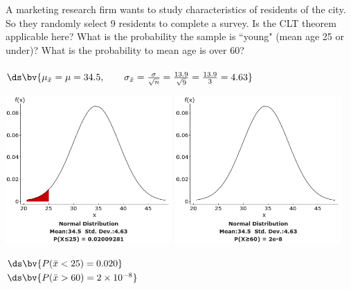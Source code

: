 \documentclass{article}
\begin{document}
\begin{flushleft}
\begin{enumalpha}
\item A marketing research firm wants to study characteristics of residents of the city. So they randomly select 9 residents to complete a survey. Is the CLT theorem applicable here? What is the probability the sample is ``young" (mean age 25 or under)? What is the probability to mean age is over 60?\\
\medskip
{}\\
\medskip
$\ds\bv{\mu_{\bar x} = \mu = 34.5, \qquad \sigma_{\bar x} = \frac{\sigma}{\sqrt n} = \frac {13.9}{\sqrt{9}} = \frac {13.9}3 = 4.63}$\\
\medskip
{\centering
\includegraphics[width=2.5in]{images/grp06_Q3_b_1} \qquad
\includegraphics[width=2.5in]{images/grp06_Q3_b_2}
\par}
$\ds\bv{P(\bar x < 25) = 0.020}$\\
\medskip
$\ds\bv{P(\bar x > 60) = 2 \times 10^{-8}}$
\end{enumalpha}


\end{flushleft}
\end{document}
